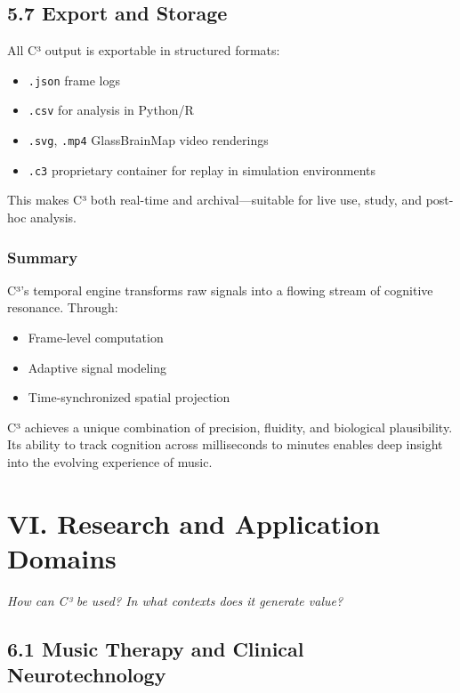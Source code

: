 \subsection*{5.7 Export and Storage}

All C³ output is exportable in structured formats:

\begin{itemize}
    \item \texttt{.json} frame logs
    \item \texttt{.csv} for analysis in Python/R
    \item \texttt{.svg}, \texttt{.mp4} GlassBrainMap video renderings
    \item \texttt{.c3} proprietary container for replay in simulation environments
\end{itemize}

This makes C³ both real-time and archival—suitable for live use, study, and post-hoc analysis.

\subsubsection*{Summary}

C³'s temporal engine transforms raw signals into a flowing stream of cognitive resonance. Through:

\begin{itemize}
    \item Frame-level computation
    \item Adaptive signal modeling
    \item Time-synchronized spatial projection
\end{itemize}

C³ achieves a unique combination of precision, fluidity, and biological plausibility. Its ability to track cognition across milliseconds to minutes enables deep insight into the evolving experience of music.

\section*{VI. Research and Application Domains}

\textit{How can C³ be used? In what contexts does it generate value?}

\subsection*{6.1 Music Therapy and Clinical Neurotechnology}

